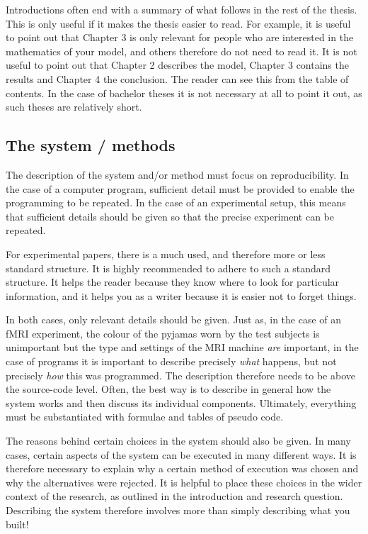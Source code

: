 Introductions often end with a summary of what follows in the rest of the thesis.
This is only useful if it makes the thesis easier to read.
For example, it is useful to point out that Chapter 3 is only relevant for people who are interested in the mathematics of your model, and others therefore do not need to read it.
It is not useful to point out that Chapter 2 describes the model, Chapter 3 contains the results and Chapter 4 the conclusion.
The reader can see this from the table of contents.
In the case of bachelor theses it is not necessary at all to point it out, as such theses are relatively short.

\subsection{The system / methods}\label{sec:_system_methods}
The description of the system and/or method must focus on reproducibility.
In the case of a computer program, sufficient detail must be provided to enable the programming to be repeated.
In the case of an experimental setup, this means that sufficient details should be given so that the precise experiment can be repeated.

For experimental papers, there is a much used, and therefore more or less standard structure.
It is  highly recommended to adhere to such a standard structure.
It helps the reader because they know where to look for particular information, and it helps you as a writer because it is easier not to forget things.

In both cases, only relevant details should be given.
Just as, in the case of an fMRI experiment, the colour of the pyjamas worn by the test subjects is unimportant but the type and settings of the MRI machine \textit{are} important, in the case of programs it is important to describe precisely \textit{what} happens, but not precisely \textit{how} this was programmed.
The description therefore needs to be above the source-code level.
Often, the best way is to describe in general how the system works and then discuss its individual components.
Ultimately, everything must be substantiated with formulae and tables of pseudo code.

The reasons behind certain choices in the system should also be given.
In many cases, certain aspects of the system can be executed in many different ways.
It is therefore necessary to explain why a certain method of execution was chosen and why the alternatives were rejected.
It is helpful to place these choices in the wider context of the research, as outlined in the introduction and research question.
Describing the system therefore involves more than simply describing what you built!

